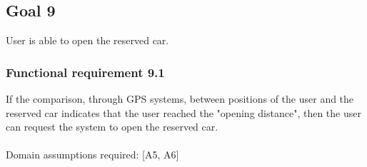 \subsection{Goal 9}
User is able to open the reserved car.

\setcounter{secnumdepth}{3}
\subsubsection{Functional requirement 9.1}
If the comparison, through GPS systems, between positions of the user and the reserved car indicates that the user reached the "opening distance", then the user can request the system to open the reserved car.\\~\\
\noindent Domain assumptions required: [A5, A6]